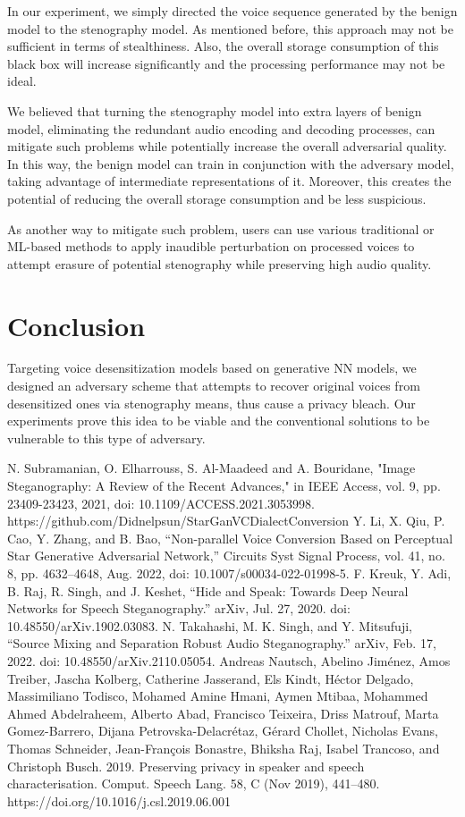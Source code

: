 \documentclass[journal]{IEEEtran} %
\begin{document}
In our experiment, we simply directed the voice sequence generated by the benign model to the stenography model. As mentioned before, this approach may not be sufficient in terms of stealthiness. Also, the overall storage consumption of this black box will increase significantly and the processing performance may not be ideal. 

We believed that turning the stenography model into extra layers of benign model, eliminating the redundant audio encoding and decoding processes, can mitigate such problems while potentially increase the overall adversarial quality. In this way, the benign model can train in conjunction with the adversary model, taking advantage of intermediate representations of it. Moreover, this creates the potential of reducing the overall storage consumption and be less suspicious.

As another way to mitigate such problem, users can use various traditional or ML-based methods to apply inaudible perturbation on processed voices to attempt erasure of potential stenography while preserving high audio quality.

\section{Conclusion}

Targeting voice desensitization models based on generative NN models, we designed an adversary scheme that attempts to recover original voices from desensitized ones via stenography means, thus cause a privacy bleach. Our experiments prove this idea to be viable and the conventional solutions to be vulnerable to this type of adversary.

\begin{thebibliography}{00}
     N. Subramanian, O. Elharrouss, S. Al-Maadeed and A. Bouridane, "Image Steganography: A Review of the Recent Advances," in IEEE Access, vol. 9, pp. 23409-23423, 2021, doi: 10.1109/ACCESS.2021.3053998.
     https://github.com/Didnelpsun/StarGanVCDialectConversion
     Y. Li, X. Qiu, P. Cao, Y. Zhang, and B. Bao, “Non-parallel Voice Conversion Based on Perceptual Star Generative Adversarial Network,” Circuits Syst Signal Process, vol. 41, no. 8, pp. 4632–4648, Aug. 2022, doi: 10.1007/s00034-022-01998-5.
     F. Kreuk, Y. Adi, B. Raj, R. Singh, and J. Keshet, “Hide and Speak: Towards Deep Neural Networks for Speech Steganography.” arXiv, Jul. 27, 2020. doi: 10.48550/arXiv.1902.03083.
     N. Takahashi, M. K. Singh, and Y. Mitsufuji, “Source Mixing and Separation Robust Audio Steganography.” arXiv, Feb. 17, 2022. doi: 10.48550/arXiv.2110.05054.
     Andreas Nautsch, Abelino Jiménez, Amos Treiber, Jascha Kolberg, Catherine Jasserand, Els Kindt, Héctor Delgado, Massimiliano Todisco, Mohamed Amine Hmani, Aymen Mtibaa, Mohammed Ahmed Abdelraheem, Alberto Abad, Francisco Teixeira, Driss Matrouf, Marta Gomez-Barrero, Dijana Petrovska-Delacrétaz, Gérard Chollet, Nicholas Evans, Thomas Schneider, Jean-François Bonastre, Bhiksha Raj, Isabel Trancoso, and Christoph Busch. 2019. Preserving privacy in speaker and speech characterisation. Comput. Speech Lang. 58, C (Nov 2019), 441–480. https://doi.org/10.1016/j.csl.2019.06.001
\end{thebibliography}
\end{document}
